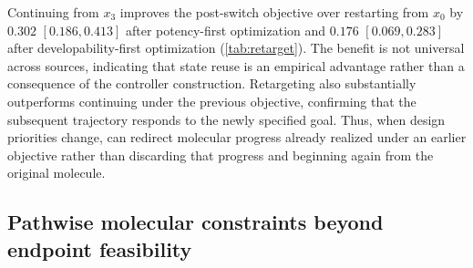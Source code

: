 Continuing from $x_3$ improves the post-switch objective over restarting from $x_0$ by $0.302$ $[0.186,0.413]$ after potency-first optimization and $0.176$ $[0.069,0.283]$ after developability-first optimization (\cref{tab:retarget}). The benefit is not universal across sources, indicating that state reuse is an empirical advantage rather than a consequence of the controller construction. Retargeting also substantially outperforms continuing under the previous objective, confirming that the subsequent trajectory responds to the newly specified goal. Thus, when design priorities change, \method{} can redirect molecular progress already realized under an earlier objective rather than discarding that progress and beginning again from the original molecule.

\subsection{Pathwise molecular constraints beyond endpoint feasibility}
\label{sec:exp-pathwise}

